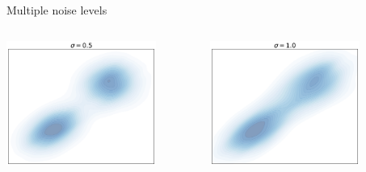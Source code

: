 \documentclass[handout, aspectratio=169,xcolor=dvipsnames]{beamer}
\begin{document}
\begin{frame}{Multiple noise levels}
\begin{columns}
\begin{column}{0.32\textwidth}
    \end{column}
  \end{columns}

  \begin{columns}
      \begin{column}{0.32\textwidth}
      \includegraphics[width=0.8\textwidth]{figs/gen/mixture_with_noise_0.5.png}
    \end{column}
      \begin{column}{0.32\textwidth}
      \includegraphics[width=0.8\textwidth]{figs/gen/mixture_with_noise_1.0.png}
    \end{column}
        \begin{column}{0.32\textwidth}

\end{column}
\end{columns}
\end{frame}
\end{document}
